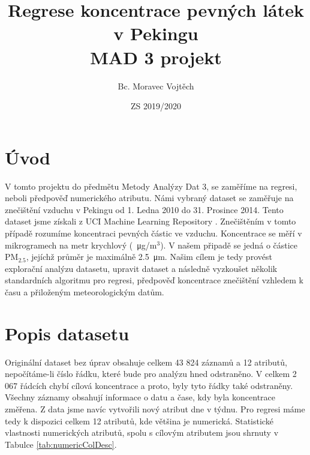 \documentclass[a4paper,12pt]{article}
\author{Bc. Moravec Vojtěch}
\title{Regrese koncentrace pevných látek v Pekingu \\ MAD 3 projekt}
\date{ZS 2019/2020}
\begin{document}
\maketitle
\newpage

\tableofcontents
\newpage

\section{Úvod}
V tomto projektu do předmětu Metody Analýzy Dat 3, se zaměříme na regresi, neboli předpověď numerického atributu. 
Námi vybraný dataset \cite{beijing_data} se zaměřuje na znečištění vzduchu v Pekingu od 1. Ledna 2010 do 31. Prosince 2014.
Tento dataset jsme získali z UCI Machine Learning Repository \cite{Dua:2019}.
Znečištěním v tomto případě rozumíme koncentraci pevných částic ve vzduchu.
Koncentrace se měří v mikrogramech na metr krychlový (\SI{}{\micro\gram}/$\text{m}^3$).
V našem připadě se jedná o částice $\text{PM}_{2.5}$, jejíchž průměr je maximálně \SI{2,5}{\micro\metre}.
Našim cílem je tedy provést explorační analýzu datasetu, upravit dataset a následně vyzkoušet několik standardních 
algoritmu pro regresi, předpověď koncentrace znečištění vzhledem k času a přiloženým meteorologickým datům.  

\section{Popis datasetu}
Originální dataset bez úprav obsahuje celkem 43 824 záznamů a 12 atributů, nepočítáme-li číslo řádku, které bude pro analýzu hned odstraněno. 
V celkem 2 067 řádcích chybí cílová koncentrace a proto, byly tyto řádky také odstraněny. 
Všechny záznamy obsahují informace o datu a čase, kdy byla koncentrace změřena. Z data jsme navíc vytvořili nový atribut dne v týdnu.
Pro regresi máme tedy k dispozici celkem 12 atributů, kde většina je numerická. 
Statistické vlastnosti numerických atributů, spolu s cílovým atributem jsou shrnuty v Tabulce \ref{tab:numericColDesc}.
\end{document}
